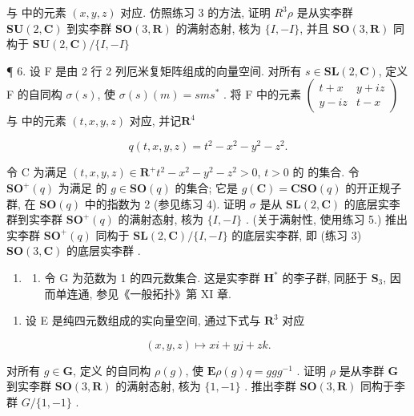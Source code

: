 与  中的元素 \((x,y,z)\) 对应. 仿照练习 3 的方法, 证明 \(R^{3}\)\(\rho\) 是从实李群 \(\mathbf{SU}(2,\mathbf{C})\) 到实李群 \(\mathbf{SO}(3,\mathbf{R})\) 的满射态射, 核为 \(\{I,-I\}\), 并且 \(\mathbf{SO}(3,\mathbf{R})\) 同构于 \(\mathbf{SU}(2,\mathbf{C})/\{I,-I\}\)

¶ 6. 设 F 是由 2 行 2 列厄米复矩阵组成的向量空间. 对所有 \(s \in \mathbf{SL}(2, \mathbf{C})\), 定义 F 的自同构 \(\sigma(s)\), 使 \(\sigma(s)(m) = sms^*\) . 将 F 中的元素 \(\begin{pmatrix} t + x & y + iz \\ y - iz & t - x \end{pmatrix}\) 与  中的元素 \((t, x, y, z)\) 对应, 并记\(\mathbf{R}^4\)

\[
q (t, x, y, z) = t ^ {2} - x ^ {2} - y ^ {2} - z ^ {2}.
\]

令 C 为满足 \((t, x, y, z) \in \mathbf{R}^+\)\(t^2 - x^2 - y^2 - z^2 > 0\), \(t > 0\) 的  的集合. 令 \(\mathbf{SO}^+(q)\) 为满足  的 \(g \in \mathbf{SO}(q)\) 的集合; 它是 \(g(\mathbf{C}) = \mathbf{C}\)\(\mathbf{SO}(q)\) 的开正规子群, 在 \(\mathbf{SO}(q)\) 中的指数为 2 (参见练习 4). 证明 \(\sigma\) 是从 \(\mathbf{SL}(2, \mathbf{C})\) 的底层实李群到实李群 \(\mathbf{SO}^+(q)\) 的满射态射, 核为 \(\{I, -I\}\) . (关于满射性, 使用练习 5.) 推出实李群 \(\mathbf{SO}^+(q)\) 同构于 \(\mathbf{SL}(2, \mathbf{C}) / \{I, -I\}\) 的底层实李群, 即 (练习 3) \(\mathbf{SO}(3, \mathbf{C})\) 的底层实李群 .

\begin{enumerate}
\def\labelenumi{\arabic{enumi}.}
\setcounter{enumi}{6}
\tightlist
\item
  \begin{enumerate}
  \def\labelenumii{(\alph{enumii})}
  \tightlist
  \item
    令 G 为范数为 1 的四元数集合. 这是实李群 \(\mathbf{H}^*\) 的李子群, 同胚于 \(\mathbf{S}_3\), 因而单连通, 参见《一般拓扑》第 XI 章.
  \end{enumerate}
\end{enumerate}

\begin{enumerate}
\def\labelenumi{(\alph{enumi})}
\setcounter{enumi}{1}
\tightlist
\item
  设 E 是纯四元数组成的实向量空间, 通过下式与 \(\mathbf{R}^3\) 对应
\end{enumerate}

\[
(x, y, z) \mapsto x i + y j + z k.
\]

对所有 \(g \in \mathbf{G}\), 定义  的自同构 \(\rho(g)\), 使 \(\mathbf{E}\)\(\rho(g)q = ggg^{-1}\) . 证明 \(\rho\) 是从李群 \(\mathbf{G}\) 到实李群 \(\mathbf{SO}(3, \mathbf{R})\) 的满射态射, 核为 \(\{1, -1\}\) . 推出李群 \(\mathbf{SO}(3, \mathbf{R})\) 同构于李群 \(G / \{1, -1\}\) .


